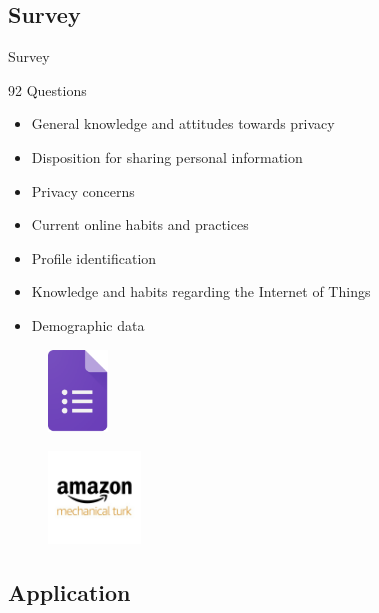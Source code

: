 \documentclass[xcolor={svgnames},aspectratio=169]{beamer}
\begin{document}
\subsection{Survey}

\begin{frame}[shrink]{Survey}
    \begin{multicols}{2}
        92 Questions
        \begin{itemize}
            \item General knowledge and attitudes towards privacy
            \item Disposition for sharing personal information
            \item Privacy concerns
            \item Current online habits and practices
            \item Profile identification
            \item Knowledge and habits regarding the Internet of Things
            \item Demographic data
        \end{itemize}

        \columnbreak
        \begin{figure}
            \centering\includegraphics[width=45pt]{assets/images/forms.png}
        \end{figure}
        \begin{figure}
            \centering\includegraphics[width=70pt]{assets/images/mturk.jpg}
        \end{figure}
    \end{multicols}
\end{frame}

\subsection{Application}
\end{document}
